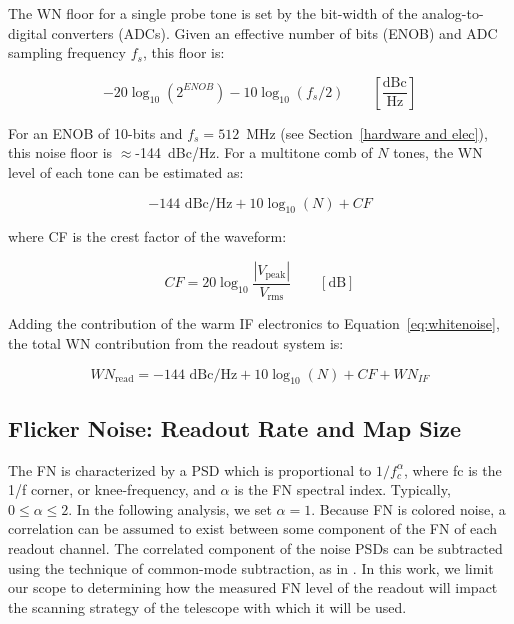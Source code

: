 The WN floor for a single probe tone is set by the bit-width of the analog-to-digital converters (ADCs). Given an effective number of bits (ENOB) and ADC sampling frequency $f_{s}$, this floor is:

\begin{equation}
-20\log_{10}(2^{ENOB})- 10\log_{10}(f_{s}/2) \qquad \left[ \frac{\mathrm{dBc}}{\mathrm{Hz}} \right]
\end{equation}

For an ENOB of 10-bits and $f_{s} = 512$~MHz (see Section~\ref{hardware and elec}), this noise floor is $\approx$-144~dBc/Hz. For a multitone comb of $N$ tones, the WN level of each tone can be estimated as:

\begin{equation}\label{eq:whitenoise}
-144 \textrm{ dBc/Hz} + 10\log_{10}(N) + CF
\end{equation}

where CF is the crest factor of the waveform:

\begin{equation}
  CF = 20\log_{10}\frac{ |V_{\mathrm{peak}}|}{V_{\mathrm{rms}}} \qquad [\mathrm{dB}]
\end{equation}

Adding the contribution of the warm IF electronics to Equation~\ref{eq:whitenoise}, the total WN contribution from the readout system is:

\begin{equation}\label{eq:readout_noise}
  WN_{\mathrm{read}} = -144 \textrm{ dBc/Hz} + 10\log_{10}(N) + CF + WN_{IF}
\end{equation}

\subsection{Flicker Noise: Readout Rate and Map Size}\label{flicker noise}

The FN is characterized by a PSD which is proportional to $1/f_{c}^{\alpha}$, where \gls{fc} is the 1/f corner, or knee-frequency, and $\alpha$ is the FN spectral index. Typically, $0 \leq \alpha \leq 2$. In the following analysis, we set $\alpha = 1$. Because FN is colored noise, a correlation can be assumed to exist between some component of the FN of each readout channel. The correlated component of the noise PSDs can be subtracted using the technique of common-mode subtraction, as in \citet{van2016multiplexed}. In this work, we limit our scope to determining how the measured FN level of the readout will impact the scanning strategy of the telescope with which it will be used.

